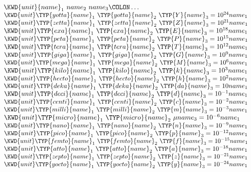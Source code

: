 \begin{Fortress}
\(\KWD{unit} {name}_{1}~{name}_{2}~{name}_{3}\COLON \ldots\)\\
\(\KWD{unit} \TYP{yotta} {name}_{1}~\TYP{yotta} {name}_{2}~ \TYP{Y} {name}_{3} = 10^{24} {name}_{1}\)\\
\(\KWD{unit} \TYP{zetta} {name}_{1}~\TYP{zetta} {name}_{2}~ \TYP{Z} {name}_{3} = 10^{21}  {name}_{1}\)\\
\(\KWD{unit} \TYP{exa} {name}_{1}~\TYP{exa} {name}_{2}~ \TYP{E} {name}_{3} = 10^{18}  {name}_{1}\)\\
\(\KWD{unit} \TYP{peta} {name}_{1}~\TYP{peta} {name}_{2}~ \TYP{P} {name}_{3} = 10^{15}  {name}_{1}\)\\
\(\KWD{unit} \TYP{tera} {name}_{1}~\TYP{tera} {name}_{2}~ \TYP{T} {name}_{3} = 10^{12}  {name}_{1}\)\\
\(\KWD{unit} \TYP{giga} {name}_{1}~\TYP{giga} {name}_{2}~ \TYP{G} {name}_{3} = 10^{9}  {name}_{1}\)\\
\(\KWD{unit} \TYP{mega} {name}_{1}~\TYP{mega} {name}_{2}~ \TYP{M} {name}_{3} = 10^{6}  {name}_{1}\)\\
\(\KWD{unit} \TYP{kilo} {name}_{1}~\TYP{kilo} {name}_{2}~ \TYP{k} {name}_{3} = 10^{3}  {name}_{1}\)\\
\(\KWD{unit} \TYP{hecto} {name}_{1}~\TYP{hecto} {name}_{2}~ \TYP{h} {name}_{3} = 10^{2}  {name}_{1}\)\\
\(\KWD{unit} \TYP{deka} {name}_{1}~\TYP{deka} {name}_{2}~ \TYP{da} {name}_{3} = 10  {name}_{1}\)\\
\(\KWD{unit} \TYP{deci} {name}_{1}~\TYP{deci} {name}_{2}~ \TYP{d} {name}_{3} = 10^{-1}  {name}_{1}\)\\
\(\KWD{unit} \TYP{centi} {name}_{1}~\TYP{centi} {name}_{2}~ \TYP{c} {name}_{3} = 10^{-2}  {name}_{1}\)\\
\(\KWD{unit} \TYP{milli} {name}_{1}~\TYP{milli} {name}_{2}~ \TYP{m} {name}_{3} = 10^{-3}  {name}_{1}\)\\
\(\KWD{unit} \TYP{micro} {name}_{1}~\TYP{micro} {name}_{2}~ \mu {name}_{3} = 10^{-6}  {name}_{1}\)\\
\(\KWD{unit} \TYP{nano} {name}_{1}~\TYP{nano} {name}_{2}~ \TYP{n} {name}_{3} = 10^{-9}  {name}_{1}\)\\
\(\KWD{unit} \TYP{pico} {name}_{1}~\TYP{pico} {name}_{2}~ \TYP{p} {name}_{3} = 10^{-12}  {name}_{1}\)\\
\(\KWD{unit} \TYP{femto} {name}_{1}~\TYP{femto} {name}_{2}~ \TYP{f} {name}_{3} = 10^{-15}  {name}_{1}\)\\
\(\KWD{unit} \TYP{atto} {name}_{1}~\TYP{atto} {name}_{2}~ \TYP{a} {name}_{3} = 10^{-18}  {name}_{1}\)\\
\(\KWD{unit} \TYP{zepto} {name}_{1}~\TYP{zepto} {name}_{2}~ \TYP{z} {name}_{3} = 10^{-21}  {name}_{1}\)\\
\(\KWD{unit} \TYP{yocto} {name}_{1}~\TYP{yocto} {name}_{2}~ \TYP{y} {name}_{3} = 10^{-24}  {name}_{1}\)
\end{Fortress}
